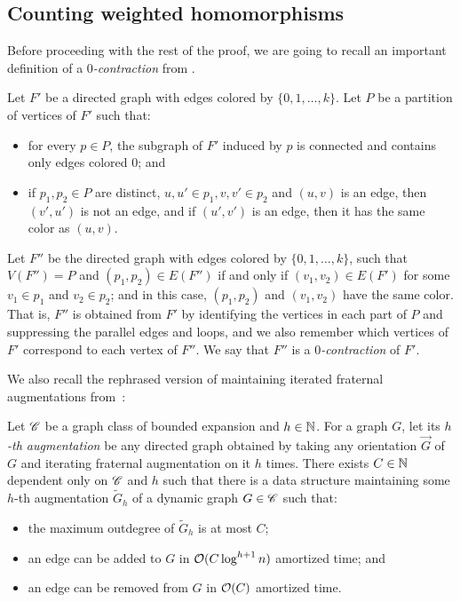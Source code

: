 \subsection{Counting weighted homomorphisms}
Before proceeding with the rest of the proof, we are going to recall an important definition of a \textit{$0$-contraction} from \cite{DvorakTumaArxiv}.

\begin{definition}
	Let $F'$ be a directed graph with edges colored by $\{0, 1, \ldots, k\}$. Let $P$ be a partition of vertices of $F'$ such that:
	\begin{itemize}
		\item for every $p \in P$, the subgraph of $F'$ induced by $p$ is connected and contains only edges colored $0$; and
		\item if $p_1, p_2 \in P$ are distinct, $u, u' \in p_1, v, v' \in p_2$ and $(u, v)$ is an edge, then $(v', u')$ is not an edge, and if $(u', v')$ is an edge, then it has the same color as $(u, v)$.
	\end{itemize}
	Let $F''$ be the directed graph with edges colored by $\{0, 1, \ldots, k\}$, such that $V(F'') = P$ and $(p_1, p_2) \in E(F'')$ if and only if $(v_1, v_2) \in E(F')$ for some $v_1 \in p_1$ and $v_2 \in p_2$; and in this case, $(p_1, p_2)$ and $(v_1, v_2)$ have the same color. That is, $F''$ is obtained from $F'$ by identifying the vertices in each part of $P$ and suppressing the parallel edges and loops, and we also remember which vertices of $F'$ correspond to each vertex of $F''$. We say that $F''$ is a \textit{$0$-contraction} of $F'$.
\end{definition}

We also recall the rephrased version of maintaining iterated fraternal augmentations from~\cite{DvorakTumaArxiv}:
\begin{theorem} \label{thm:maintaining-augmentation}
	Let $\mathscr C$ be a graph class of bounded expansion and $h \in \mathbb{N}$. For a graph $G$, let its \emph{$h$-th augmentation} be any directed graph obtained by taking any orientation $\vec G$ of $G$ and iterating fraternal augmentation on it $h$ times. There exists $C \in \mathbb{N}$ dependent only on $\mathscr C$ and $h$ such that there is a data structure maintaining some $h$-th augmentation $\tilde{G}_h$ of a dynamic graph $G \in \mathscr C$ such that:
	\begin{itemize}
		\item the maximum outdegree of $\tilde{G}_h$ is at most $C$;
		\item an edge can be added to $G$ in $\mathcal{O}(C \log^{h+1} n)$ amortized time; and
		\item an edge can be removed from $G$ in $\mathcal{O}(C)$ amortized time.
	\end{itemize}
\end{theorem}

